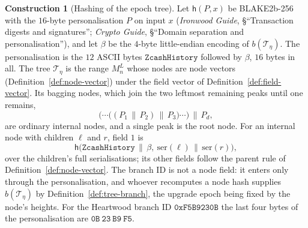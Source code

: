 \documentclass[11pt,a4paper]{article}
\theoremstyle{definition}
\newtheorem{construction}[theorem]{Construction}
\begin{document}
\begin{construction}[Hashing of the epoch tree]\label{def:history-tree}
Let $\mathsf{h}(P, x)$ be BLAKE2b-256 with the $16$-byte personalisation $P$
on input $x$ (\emph{Ironwood Guide}, \S``Transaction digests and
signatures''; \emph{Crypto Guide}, \S``Domain separation and
personalisation''), and let $\beta$ be the $4$-byte little-endian encoding
of $b(\mathcal{T}_\eta)$. The personalisation is the $12$ ASCII bytes
$\texttt{ZcashHistory}$ followed by $\beta$, $16$ bytes in all. The tree
$\mathcal{T}_\eta$ is the range $M^L_n$ whose nodes are node vectors
(Definition~\ref{def:node-vector}) under the field vector of
Definition~\ref{def:field-vector}. Its bagging nodes, which join the two
leftmost remaining peaks until one remains,
\[
  \bigl(\cdots\bigl((P_1 \,\|\, P_2) \,\|\, P_3\bigr) \cdots\bigr)
  \,\|\, P_d ,
\]
are ordinary internal nodes, and a single peak is the root node. For an
internal node with children $\ell$ and $r$, field $1$ is
\[
  \mathsf{h}\bigl(\texttt{ZcashHistory} \,\|\, \beta,\
    \mathrm{ser}(\ell) \,\|\, \mathrm{ser}(r)\bigr),
\]
over the children's full serialisations; its other fields follow the parent
rule of Definition~\ref{def:node-vector}. The branch ID is not a node field:
it enters only through the personalisation, and whoever recomputes a node
hash supplies $b(\mathcal{T}_\eta)$ by Definition~\ref{def:tree-branch}, the
upgrade epoch being fixed by the node's heights. For the Heartwood branch ID
$\mathtt{0xF5B9230B}$ the last four bytes of the personalisation are
$\mathtt{0B}\ \mathtt{23}\ \mathtt{B9}\ \mathtt{F5}$.
\end{construction}
\end{document}
